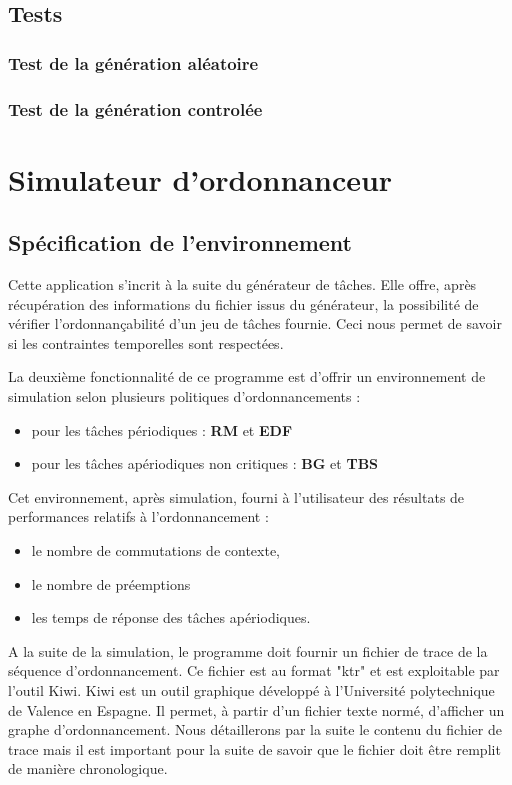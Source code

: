 \section{Tests}
    \subsection{Test de la génération aléatoire}
    \subsection{Test de la génération controlée}


\chapter{Simulateur d'ordonnanceur}
	\section{Spécification de l’environnement}
		Cette application s'incrit à la suite du générateur de tâches. Elle offre, après récupération des informations du fichier issus du générateur, la possibilité de vérifier l'ordonnançabilité d'un jeu de tâches fournie. Ceci nous permet de savoir si les contraintes temporelles sont respectées. 

	La deuxième fonctionnalité de ce programme est d'offrir un environnement de simulation selon plusieurs politiques d'ordonnancements :
	\begin{itemize}
		\item pour les tâches périodiques : \textbf{RM} et \textbf{EDF}
		\item pour les tâches apériodiques non critiques :  \textbf{BG} et \textbf{TBS}
	\end{itemize}
	Cet environnement, après simulation, fourni à l'utilisateur des résultats de performances relatifs à l'ordonnancement : 
	\begin{itemize}
		\item le nombre de commutations de contexte,
		\item le nombre de préemptions
		\item les temps de réponse des tâches apériodiques.
	\end{itemize}
	
	A la suite de la simulation, le programme doit fournir un fichier de trace de la séquence d'ordonnancement. Ce fichier est au format "ktr" et est exploitable par l'outil Kiwi. 
	Kiwi est un outil graphique développé à l'Université polytechnique de Valence en Espagne. Il permet, à partir d'un fichier texte normé, d'afficher un graphe d'ordonnancement. Nous détaillerons par la suite le contenu du fichier de trace mais il est important pour la suite de savoir que le fichier doit être remplit de manière chronologique.
		
